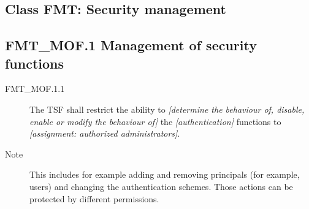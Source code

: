 \documentclass[10pt,a4paper,english]{scrbook}
\begin{document}
\hypertarget{class-fmt-security-management}{}
\subsection{Class FMT: Security management}



\hypertarget{fmt-mof-1-management-of-security-functions}{}
\subsection{FMT{\_}MOF.1 Management of security functions}
\begin{description}
\item[FMT{\_}MOF.1.1]

The TSF shall restrict the ability to \emph{{[}determine the
behaviour of, disable, enable or modify the behaviour of]} the
\emph{{[}authentication]} functions to \emph{{[}assignment: 
authorized administrators]}.

\item[Note]

This includes for example adding and removing principals (for example,
users) and changing the authentication schemes. Those actions can be
protected by different permissions.

\end{description}



\hypertarget{fmt-msa-1-management-of-security-attributes}{}
\end{document}
